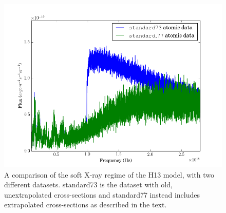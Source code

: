 \begin{figure}
\centering
\includegraphics[width=1.0\textwidth]{figures/03-radtrans/xs.png}
\caption{
A comparison of the soft X-ray regime of the H13 model, with two different
datasets. standard73 is the dataset with old, unextrapolated cross-sections 
and standard77 instead includes extrapolated cross-sections as described in
the text.
}
\label{fig:xs}
\end{figure}





